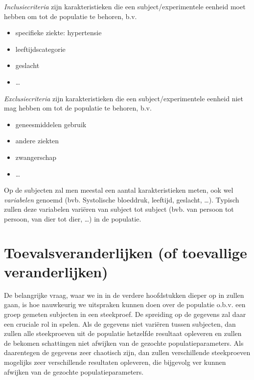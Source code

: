 \documentclass[
  12pt,dutch,coursenotes]{book}
\providecommand{\tightlist}{%
  \setlength{\itemsep}{0pt}\setlength{\parskip}{0pt}}
\theoremstyle{definition}
\theoremstyle{definition}
\theoremstyle{definition}
\theoremstyle{definition}
\theoremstyle{remark}
\begin{document}
\emph{Inclusiecriteria} zijn karakteristieken die een subject/experimentele eenheid moet hebben om tot de populatie te behoren, b.v.

\begin{itemize}
\tightlist
\item
  specifieke ziekte: hypertensie
\item
  leeftijdscategorie
\item
  geslacht
\item
  \ldots{}
\end{itemize}

\emph{Exclusiecriteria} zijn karakteristieken die een subject/experimentele eenheid niet mag hebben om tot de populatie te behoren, b.v.

\begin{itemize}
\tightlist
\item
  geneesmiddelen gebruik
\item
  andere ziekten
\item
  zwangerschap
\item
  \ldots{}
\end{itemize}

Op de subjecten zal men meestal een aantal karakteristieken meten, ook wel \emph{variabelen} genoemd (bvb. Systolische bloeddruk, leeftijd, geslacht, \ldots). Typisch zullen deze variabelen variëren van subject tot subject (bvb. van persoon tot persoon, van dier tot dier, \ldots) in de populatie.

\hypertarget{toevalsveranderlijken-of-toevallige-veranderlijken}{%
\section{Toevalsveranderlijken (of toevallige veranderlijken)}\label{toevalsveranderlijken-of-toevallige-veranderlijken}}

De belangrijke vraag, waar we in in de verdere hoofdstukken dieper op in
zullen gaan, is hoe nauwkeurig we uitspraken kunnen doen over de populatie o.b.v. een groep gemeten subjecten in een steekproef.
De spreiding op de gegevens zal daar een cruciale rol in spelen.
Als de gegevens niet variëren tussen subjecten, dan zullen alle steekproeven uit de populatie hetzelfde resultaat opleveren en zullen de bekomen schattingen niet afwijken van de gezochte populatieparameters.
Als daarentegen de gegevens zeer chaotisch zijn, dan zullen verschillende steekproeven mogelijks zeer verschillende resultaten opleveren, die bijgevolg ver kunnen afwijken van de gezochte populatieparameters.
\end{document}
